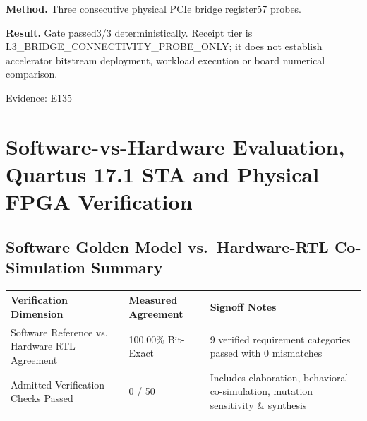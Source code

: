 \documentclass[11pt,a4paper]{article}
\begin{document}
\textbf{Method.} Three consecutive physical PCIe bridge register57 probes.

\textbf{Result.} Gate passed3/\allowbreak{}3 deterministically. Receipt tier is L3\_\allowbreak{}BRIDGE\_\allowbreak{}CONNECTIVITY\_\allowbreak{}PROBE\_\allowbreak{}ONLY; it does not establish accelerator bitstream deployment,\allowbreak{} workload execution or board numerical comparison.

{\small Evidence: E135}

\section{Software-vs-Hardware Evaluation, Quartus 17.1 STA and Physical FPGA Verification}

\subsection{Software Golden Model vs.\ Hardware-RTL Co-Simulation Summary}

{\small\renewcommand{\arraystretch}{1.18}\begin{longtable}{@{}L{0.38\textwidth}|L{0.22\textwidth}|L{0.32\textwidth}@{}}\toprule

\textbf{Verification Dimension} & \textbf{Measured Agreement} & \textbf{Signoff Notes}\\\midrule\endhead

Software Reference vs. Hardware RTL Agreement & 100.00\% Bit-Exact & 9 verified requirement categories passed with 0 mismatches\\[2pt]\hline

Admitted Verification Checks Passed & 0 /\allowbreak{} 50 & Includes elaboration,\allowbreak{} behavioral co-simulation,\allowbreak{} mutation sensitivity \& synthesis\\[2pt]\hline

\bottomrule\end{longtable}}
\end{document}
